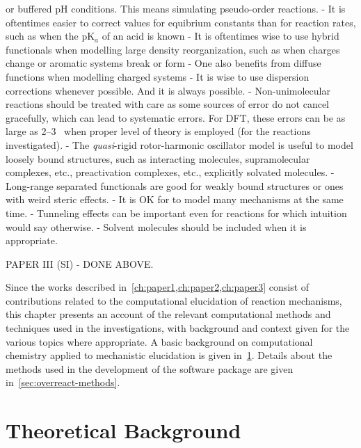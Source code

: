 or buffered pH conditions.
This means simulating pseudo-order reactions.
- It is oftentimes easier to correct values for equibrium constants than for reaction rates,
such as when the pK$_a$ of an acid is known
- It is oftentimes wise to use hybrid functionals when
modelling large density reorganization,
such as when charges change or
aromatic systems break or form
- One also benefits from diffuse functions when modelling charged systems
- It is wise to use dispersion corrections whenever possible.
And it is always possible.
- Non-unimolecular reactions should be treated with care
as some sources of error do not cancel gracefully,
which can lead to systematic errors.
For DFT,
these errors can be as large as 2--3~\kcalmol
when proper level of theory is employed (for the reactions investigated).
- The \emph{quasi}-rigid rotor-harmonic oscillator model
is useful to model loosely bound structures,
such as
interacting molecules,
supramolecular complexes,
etc.,
preactivation complexes,
etc.,
explicitly solvated molecules.
- Long-range separated functionals are good for weakly bound structures
or ones with weird steric effects.
- It is OK for \overreact{} to model many mechanisms at the same time.
- Tunneling effects can be important even for reactions for
which intuition would say otherwise.
- Solvent molecules should be included when it is appropriate.

PAPER III (SI)
- DONE ABOVE.\@



Since the works described in~\cref{ch:paper1,ch:paper2,ch:paper3} consist
of contributions related to the computational elucidation of reaction mechanisms,
this chapter presents an account of the relevant computational methods and
techniques used in the investigations,
with background and context given
for the various topics where appropriate.
A basic background on computational chemistry applied
to mechanistic elucidation is given in~\cref{sec:background-methods}.
Details about the methods used in the development of the \overreact software
package are given in~\cref{sec:overreact-methods}.

\section{Theoretical Background}%
\label{sec:background-methods}

